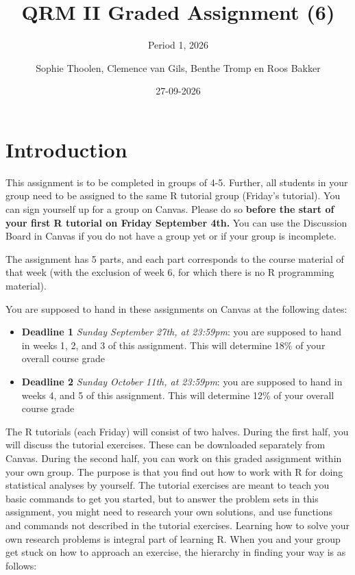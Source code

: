 \documentclass[
]{article}
\title{QRM II Graded Assignment (6)}
\subtitle{Period 1, 2026}
\author{Sophie Thoolen, Clemence van Gils, Benthe Tromp en Roos Bakker}
\date{27-09-2026}
\providecommand{\tightlist}{%
  \setlength{\itemsep}{0pt}\setlength{\parskip}{0pt}}
\begin{document}
\maketitle

\section{Introduction}\label{introduction}

This assignment is to be completed in groups of 4-5. Further, all
students in your group need to be assigned to the same R tutorial group
(Friday's tutorial). You can sign yourself up for a group on Canvas.
Please do so
\textbf{before the start of your first R tutorial on Friday September 4th.}
You can use the Discussion Board in Canvas if you do not have a group
yet or if your group is incomplete.

The assignment has 5 parts, and each part corresponds to the course
material of that week (with the exclusion of week 6, for which there is
no R programming material).

You are supposed to hand in these assignments on Canvas at the following
dates:

\begin{itemize}
\tightlist
\item
  \textbf{Deadline 1} \emph{Sunday September 27th, at 23:59pm}: you are
  supposed to hand in weeks 1, 2, and 3 of this assignment. This will
  determine 18\% of your overall course grade
\item
  \textbf{Deadline 2} \emph{Sunday October 11th, at 23:59pm}: you are
  supposed to hand in weeks 4, and 5 of this assignment. This will
  determine 12\% of your overall course grade
\end{itemize}

The R tutorials (each Friday) will consist of two halves. During the
first half, you will discuss the tutorial exercises. These can be
downloaded separately from Canvas. During the second half, you can work
on this graded assignment within your own group. The purpose is that you
find out how to work with R for doing statistical analyses by yourself.
The tutorial exercises are meant to teach you basic commands to get you
started, but to answer the problem sets in this assignment, you might
need to research your own solutions, and use functions and commands not
described in the tutorial exercises. Learning how to solve your own
research problems is integral part of learning R. When you and your
group get stuck on how to approach an exercise, the hierarchy in finding
your way is as follows:
\end{document}
